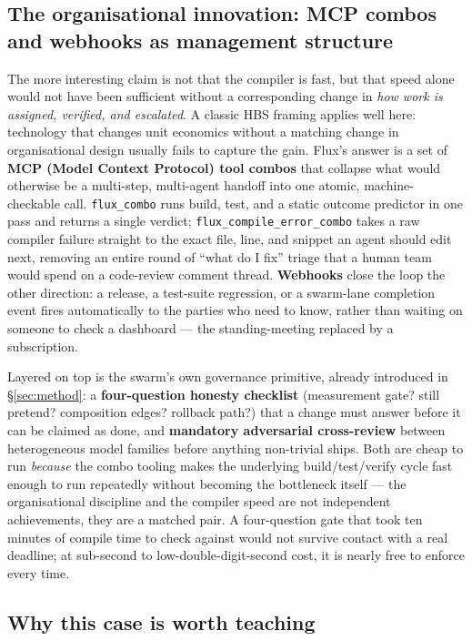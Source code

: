 \subsection{The organisational innovation: MCP combos and webhooks as management structure}

The more interesting claim is not that the compiler is fast, but that speed alone would not have been sufficient without a corresponding change in \emph{how work is assigned, verified, and escalated}. A classic HBS framing applies well here: technology that changes unit economics without a matching change in organisational design usually fails to capture the gain. Flux's answer is a set of \textbf{MCP (Model Context Protocol) tool combos} that collapse what would otherwise be a multi-step, multi-agent handoff into one atomic, machine-checkable call. \texttt{flux\_combo} runs build, test, and a static outcome predictor in one pass and returns a single verdict; \texttt{flux\_compile\_error\_combo} takes a raw compiler failure straight to the exact file, line, and snippet an agent should edit next, removing an entire round of ``what do I fix'' triage that a human team would spend on a code-review comment thread. \textbf{Webhooks} close the loop the other direction: a release, a test-suite regression, or a swarm-lane completion event fires automatically to the parties who need to know, rather than waiting on someone to check a dashboard --- the standing-meeting replaced by a subscription.

Layered on top is the swarm's own governance primitive, already introduced in \S\ref{sec:method}: a \textbf{four-question honesty checklist} (measurement gate? still pretend? composition edges? rollback path?) that a change must answer before it can be claimed as done, and \textbf{mandatory adversarial cross-review} between heterogeneous model families before anything non-trivial ships. Both are cheap to run \emph{because} the combo tooling makes the underlying build/test/verify cycle fast enough to run repeatedly without becoming the bottleneck itself --- the organisational discipline and the compiler speed are not independent achievements, they are a matched pair. A four-question gate that took ten minutes of compile time to check against would not survive contact with a real deadline; at sub-second to low-double-digit-second cost, it is nearly free to enforce every time.

\subsection{Why this case is worth teaching}

